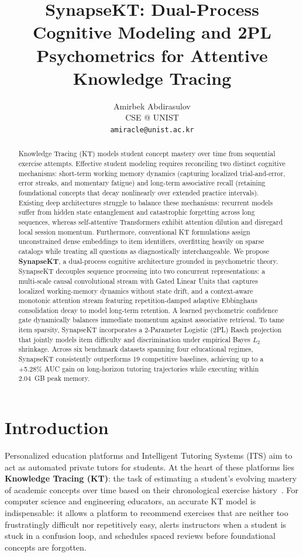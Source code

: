 \documentclass[11pt]{article}
\title{SynapseKT: Dual-Process Cognitive Modeling and 2PL Psychometrics for Attentive Knowledge Tracing}
\author{Amirbek Abdirasulov \\ CSE @ UNIST\\
  \texttt{amiracle@unist.ac.kr} \\}
\begin{document}
\maketitle

\begin{abstract}
Knowledge Tracing (KT) models student concept mastery over time from sequential exercise attempts. Effective student modeling requires reconciling two distinct cognitive mechanisms: short-term working memory dynamics (capturing localized trial-and-error, error streaks, and momentary fatigue) and long-term associative recall (retaining foundational concepts that decay nonlinearly over extended practice intervals). Existing deep architectures struggle to balance these mechanisms: recurrent models suffer from hidden state entanglement and catastrophic forgetting across long sequences, whereas self-attentive Transformers exhibit attention dilution and disregard local session momentum. Furthermore, conventional KT formulations assign unconstrained dense embeddings to item identifiers, overfitting heavily on sparse catalogs while treating all questions as diagnostically interchangeable. We propose \textbf{SynapseKT}, a dual-process cognitive architecture grounded in psychometric theory. SynapseKT decouples sequence processing into two concurrent representations: a multi-scale causal convolutional stream with Gated Linear Units that captures localized working-memory dynamics without state drift, and a context-aware monotonic attention stream featuring repetition-damped adaptive Ebbinghaus consolidation decay to model long-term retention. A learned psychometric confidence gate dynamically balances immediate momentum against associative retrieval. To tame item sparsity, SynapseKT incorporates a 2-Parameter Logistic (2PL) Rasch projection that jointly models item difficulty and discrimination under empirical Bayes $L_2$ shrinkage. Across six benchmark datasets spanning four educational regimes, SynapseKT consistently outperforms 19 competitive baselines, achieving up to a +5.28\% AUC gain on long-horizon tutoring trajectories while executing within 2.04~GB peak memory.
\end{abstract}

\section{Introduction}
\label{sec:intro}

Personalized education platforms and Intelligent Tutoring Systems (ITS) aim to act as automated private tutors for students. At the heart of these platforms lies \textbf{Knowledge Tracing (KT)}: the task of estimating a student's evolving mastery of academic concepts over time based on their chronological exercise history~\citep{corbett1994knowledge,piech2015deep}. For computer science and engineering educators, an accurate KT model is indispensable: it allows a platform to recommend exercises that are neither too frustratingly difficult nor repetitively easy, alerts instructors when a student is stuck in a confusion loop, and schedules spaced reviews before foundational concepts are forgotten.
\end{document}
